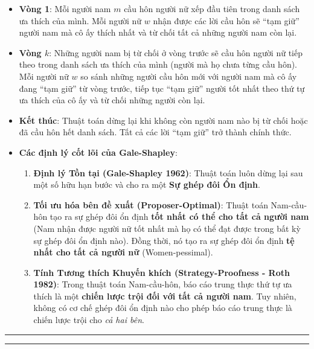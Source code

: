 \documentclass[
]{article}
\providecommand{\tightlist}{%
  \setlength{\itemsep}{0pt}\setlength{\parskip}{0pt}}
\begin{document}
\begin{itemize}
\item
  \textbf{Vòng 1}: Mỗi người nam \(m\) cầu hôn người nữ xếp đầu tiên
  trong danh sách ưa thích của mình. Mỗi người nữ \(w\) nhận được các
  lời cầu hôn sẽ ``tạm giữ'' người nam mà cô ấy thích nhất và từ chối
  tất cả những người nam còn lại.
\item
  \textbf{Vòng \(k\)}: Những người nam bị từ chối ở vòng trước sẽ cầu
  hôn người nữ tiếp theo trong danh sách ưa thích của mình (người mà họ
  chưa từng cầu hôn). Mỗi người nữ \(w\) so sánh những người cầu hôn mới
  với người nam mà cô ấy đang ``tạm giữ'' từ vòng trước, tiếp tục ``tạm
  giữ'' người tốt nhất theo thứ tự ưa thích của cô ấy và từ chối những
  người còn lại.
\item
  \textbf{Kết thúc}: Thuật toán dừng lại khi không còn người nam nào bị
  từ chối hoặc đã cầu hôn hết danh sách. Tất cả các lời ``tạm giữ'' trở
  thành chính thức.
\item
  \textbf{Các định lý cốt lõi của Gale-Shapley}:

  \begin{enumerate}
  \def\labelenumi{\arabic{enumi}.}
  \tightlist
  \item
    \textbf{Định lý Tồn tại (Gale-Shapley 1962)}: Thuật toán luôn dừng
    lại sau một số hữu hạn bước và cho ra một \textbf{Sự ghép đôi Ổn
    định}.
  \item
    \textbf{Tối ưu hóa bên đề xuất (Proposer-Optimal)}: Thuật toán
    Nam-cầu-hôn tạo ra sự ghép đôi ổn định \textbf{tốt nhất có thể cho
    tất cả người nam} (Nam nhận được người nữ tốt nhất mà họ có thể đạt
    được trong bất kỳ sự ghép đôi ổn định nào). Đồng thời, nó tạo ra sự
    ghép đôi ổn định \textbf{tệ nhất cho tất cả người nữ}
    (Women-pessimal).
  \item
    \textbf{Tính Tương thích Khuyến khích (Strategy-Proofness - Roth
    1982)}: Trong thuật toán Nam-cầu-hôn, báo cáo trung thực thứ tự ưa
    thích là một \textbf{chiến lược trội đối với tất cả người nam}. Tuy
    nhiên, không có cơ chế ghép đôi ổn định nào cho phép báo cáo trung
    thực là chiến lược trội cho \emph{cả hai bên}.
  \end{enumerate}
\end{itemize}

\begin{center}\rule{0.5\linewidth}{0.5pt}\end{center}

\begin{center}\rule{0.5\linewidth}{0.5pt}\end{center}
\end{document}
